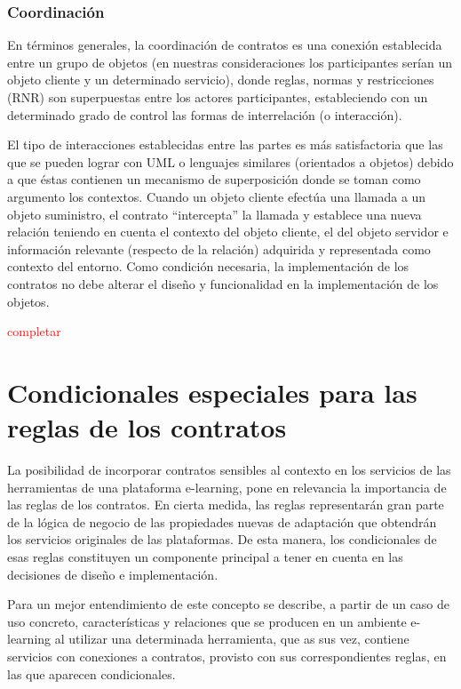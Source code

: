 \subsubsection {Coordinación}

En términos generales, la coordinación de contratos es una conexión establecida
entre un grupo de objetos (en nuestras consideraciones los participantes
serían un objeto cliente y un determinado servicio), donde reglas, normas y
restricciones (RNR) son superpuestas entre los actores participantes, estableciendo
con un determinado grado de control las formas de interrelación (o
interacción).

El tipo de interacciones establecidas entre las partes es más satisfactoria
que las que se pueden lograr con UML o lenguajes similares (orientados a objetos)
debido a que éstas contienen un mecanismo de superposición donde se
toman como argumento los contextos. Cuando un objeto cliente efectúa una
llamada a un objeto suministro, el contrato “intercepta” la llamada y establece
una nueva relación teniendo en cuenta el contexto del objeto cliente, el
del objeto servidor e información relevante (respecto de la relación) adquirida
y representada como contexto del entorno. Como condición necesaria, la
implementación de los contratos no debe alterar el diseño y funcionalidad en
la implementación de los objetos.


\textcolor{red}{completar}



\section{Condicionales especiales para las reglas de los contratos}


La posibilidad de incorporar contratos sensibles al contexto en los servicios de las herramientas de una plataforma e-learning, pone en relevancia la importancia de las reglas de los contratos. En cierta medida, las reglas representarán gran parte de la lógica de negocio de las propiedades nuevas de adaptación que obtendrán los servicios originales de las plataformas. De esta manera, los condicionales de esas reglas constituyen un componente principal a tener en cuenta en las decisiones de diseño e implementación.

Para un mejor entendimiento de este concepto se describe, a partir de un caso de uso concreto, características y relaciones que se producen en un ambiente e-learning al utilizar una determinada herramienta, que as sus vez, contiene servicios con conexiones a contratos, provisto con sus correspondientes reglas, en las que aparecen condicionales.  



